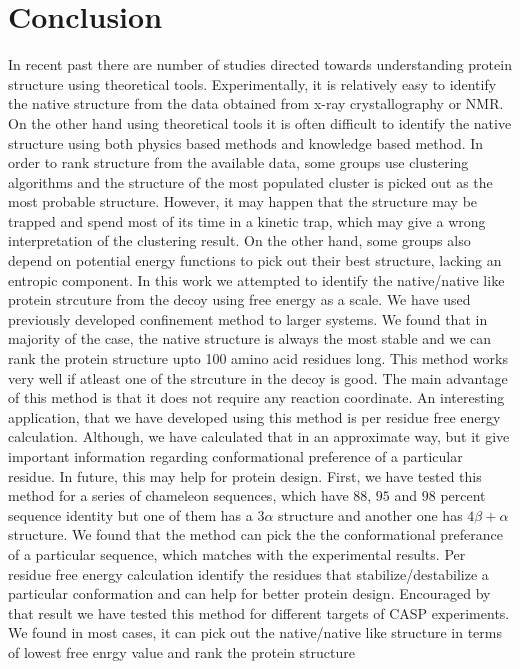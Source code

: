 \documentclass[12pt]{article}
\begin{document}
\section{Conclusion}


In recent past there are number of studies directed towards understanding protein 
structure using theoretical tools. Experimentally, it is relatively easy to identify the native structure from the data obtained 
from x-ray crystallography or NMR. On the other hand using theoretical tools it is often difficult to identify the native structure 
using both physics based methods and knowledge based method. In order to rank structure from the available data, some groups use 
clustering algorithms and the structure of the
most populated cluster is picked out as the most probable structure. However, it may happen that the structure may be trapped and 
spend most of its time in a kinetic trap, which may give a wrong interpretation of the clustering result. On the other hand, some groups
also depend on potential energy functions to pick out their best structure, lacking an entropic
component. In this work we attempted to identify the native/native like protein strcuture from the decoy using free energy as a scale.
We have used previously developed confinement method to larger systems.
We found that in majority of the case, the native structure is always the most stable and we can rank the protein structure upto 100 amino 
acid residues long. This method works very well if atleast one of the strcuture in the decoy is good. The main advantage of this method is 
that it does not require any reaction coordinate. An interesting application, that we have developed using this method is per residue
free energy calculation. Although, we have calculated that in an approximate way, but it give important information regarding conformational 
preference of a particular residue. In future, this may help for protein design. 
First, we have tested this method for a series of chameleon sequences, which have $88$, $95$ and $98$ percent sequence identity
but one of them has a $3 \alpha$ structure and another one has $4 \beta + \alpha$ structure. We found that the method can pick the 
the conformational preferance of a particular sequence, which matches with the experimental results. Per residue free energy calculation 
identify the residues that stabilize/destabilize a particular conformation and can help for better protein design. 
Encouraged by that result we have tested this method for different targets of CASP experiments. We found 
in most cases, it can pick out the native/native like structure in terms of lowest free enrgy value and rank the protein structure
\end{document}
